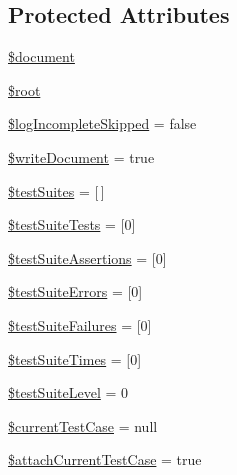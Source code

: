 \subsection*{Protected Attributes}
\begin{DoxyCompactItemize}
\item 
\mbox{\hyperlink{class_p_h_p_unit___util___log___j_unit_ac5a31edb787609a3143dec9bfa8063ea}{\$document}}
\item 
\mbox{\hyperlink{class_p_h_p_unit___util___log___j_unit_ab37f7c32f41c3c61ed940887453767f4}{\$root}}
\item 
\mbox{\hyperlink{class_p_h_p_unit___util___log___j_unit_a209cc84ec70586cd13d8ab0047324353}{\$log\+Incomplete\+Skipped}} = false
\item 
\mbox{\hyperlink{class_p_h_p_unit___util___log___j_unit_aee25ddc87ee93ffa23a9db82c6329f2f}{\$write\+Document}} = true
\item 
\mbox{\hyperlink{class_p_h_p_unit___util___log___j_unit_ae77e29943d3db7e8ceecec427fa4df94}{\$test\+Suites}} = \mbox{[}$\,$\mbox{]}
\item 
\mbox{\hyperlink{class_p_h_p_unit___util___log___j_unit_ae113b76a8aad2349aefd14cd049408b4}{\$test\+Suite\+Tests}} = \mbox{[}0\mbox{]}
\item 
\mbox{\hyperlink{class_p_h_p_unit___util___log___j_unit_aabac4698b70d0136931dbb1634d7a915}{\$test\+Suite\+Assertions}} = \mbox{[}0\mbox{]}
\item 
\mbox{\hyperlink{class_p_h_p_unit___util___log___j_unit_a76ca2226668a5ff748f02ab87de743fd}{\$test\+Suite\+Errors}} = \mbox{[}0\mbox{]}
\item 
\mbox{\hyperlink{class_p_h_p_unit___util___log___j_unit_a537944ef228b8d6c0670c1f65eb5ddf7}{\$test\+Suite\+Failures}} = \mbox{[}0\mbox{]}
\item 
\mbox{\hyperlink{class_p_h_p_unit___util___log___j_unit_a8d197cdeaafd4a09c5479eb5bf6fb41a}{\$test\+Suite\+Times}} = \mbox{[}0\mbox{]}
\item 
\mbox{\hyperlink{class_p_h_p_unit___util___log___j_unit_a6c571ecc21b678c7d0a6a8f96ec7d197}{\$test\+Suite\+Level}} = 0
\item 
\mbox{\hyperlink{class_p_h_p_unit___util___log___j_unit_a6ce871279571a4ddaf5d61da6c188ad7}{\$current\+Test\+Case}} = null
\item 
\mbox{\hyperlink{class_p_h_p_unit___util___log___j_unit_a4f6d77e26718379b3fad41739753c5c4}{\$attach\+Current\+Test\+Case}} = true
\end{DoxyCompactItemize}


